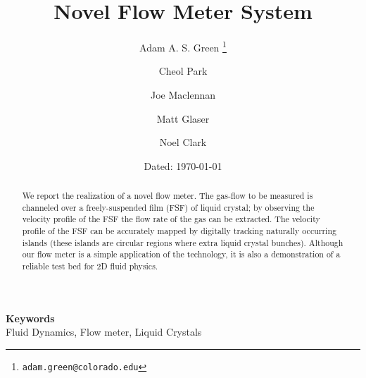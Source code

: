 \documentclass{article} %
\date{} %
\def\keywords#1{\begin{center}{\bf Keywords}\\{#1}\end{center}} %
\begin{document}
\title{Novel Flow Meter System}

\author{Adam A. S. Green%
\thanks{\texttt{adam.green@colorado.edu}}}
\author{Cheol Park}
\author{Joe Maclennan}
\author{Matt Glaser}
\author{Noel Clark}

 
\date{Dated: \today}

\maketitle

\thispagestyle{empty}




\begin{abstract}
\noindent We report the realization of a novel flow meter.
 The gas-flow to be measured is channeled over a freely-suspended
film (FSF) of liquid crystal; by observing the velocity profile of the FSF the
flow rate of the gas can be extracted. The velocity profile of the FSF can be
accurately mapped by digitally tracking naturally occurring islands (these
islands are circular regions where extra liquid crystal bunches). Although our
flow meter is a simple application of the technology, it is also a demonstration
of a reliable test bed for 2D fluid physics.
\end{abstract}

\keywords{Fluid Dynamics, Flow meter, Liquid Crystals} %




                    
\end{document}
